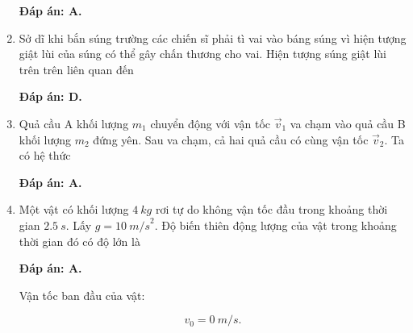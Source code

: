 \begin{enumerate}[label=\bfseries Câu \arabic*:]
	\hideall
	{	
		\textbf{Đáp án: A.}
	}
	\item {}
	
	
	{Sở dĩ khi bắn súng trường các chiến sĩ phải tì vai vào báng súng vì hiện tượng giật lùi của súng có thể gây chấn thương cho vai. Hiện tượng súng giật lùi trên trên liên quan đến 
	}
	
	\hideall
	{	
		\textbf{Đáp án: D.}
	}
	\item {}
	
	
	{	Quả cầu A khối lượng $m_1$ chuyển động với vận tốc $\vec v_1$ va chạm vào quả cầu B khối lượng $m_2$ đứng yên. Sau va chạm, cả hai quả cầu có cùng vận tốc $\vec v_2$. Ta có hệ thức
	}
	
	\hideall
	{	
		\textbf{Đáp án: A.}
	}
	\item {}
	
	
	{Một vật có khối lượng $\SI{4}{kg}$ rơi tự do không vận tốc đầu trong khoảng thời gian $\SI{2,5}{s}$. Lấy $g = \SI{10}{m/s}^2$. Độ biến thiên động lượng của vật trong khoảng thời gian đó có độ lớn là
	}
	
	\hideall
	{	
		\textbf{Đáp án: A.}
		
		Vận tốc ban đầu của vật: 
		
		$$v_0 = \SI{0}{m/s}.$$
		
}
\end{enumerate}
